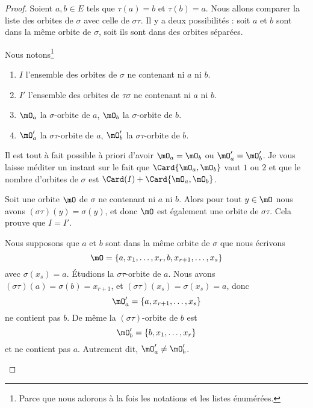 \begin{proof}
	Soient \( a,b\in E\) tels que \( \tau(a)=b\) et \( \tau(b)=a\). Nous allons comparer la liste des orbites de \( \sigma\) avec celle de \( \sigma\tau\). Il y a deux possibilités : soit \( a\) et \( b\) sont dans la même orbite de \( \sigma\), soit ils sont dans des orbites séparées.

	Nous notons\footnote{Parce que nous adorons à la fois les notations et les listes énumérées.}
	\begin{enumerate}
		\item
		      \( I\) l'ensemble des orbites de \( \sigma\) ne contenant ni \( a\) ni \( b\).
		\item
		      \( I'\) l'ensemble des orbites de \( \tau\sigma\) ne contenant ni \( a\) ni \( b\).
		\item
		      \( \mO_a\) la \( \sigma\)-orbite de \( a\), \( \mO_b\) la \( \sigma\)-orbite de \( b\).
		\item
		      \( \mO'_a\) la \( \sigma\tau\)-orbite de \( a\), \( \mO'_b\) la \( \sigma\tau\)-orbite de \( b\).
	\end{enumerate}
	Il est tout à fait possible à priori d'avoir \( \mO_a=\mO_b\) ou \( \mO'_a=\mO'_b\). Je vous laisse méditer un instant sur le fait que \( \Card\{ \mO_a,\mO_b \}\) vaut \( 1\) ou  \( 2\) et que le nombre d'orbites de \( \sigma\) est \( \Card(I)+\Card\{ \mO_a,\mO_b \}\).

	\begin{subproof}
		\spitem[\( I=I'\)]

		Soit une orbite \( \mO\) de \( \sigma\) ne contenant ni \( a\) ni \( b\). Alors pour tout \( y\in \mO\) nous avons \( (\sigma\tau)(y)=\sigma(y)\), et donc \( \mO\) est également une orbite de \( \sigma\tau\). Cela prouve que \( I=I'\).

		\spitem[Si \( \mO_a=\mO_b\)]
		Nous supposons que \( a\) et \( b\) sont dans la même orbite de \( \sigma\) que nous écrivons
		\begin{equation}
			\mO=\{ a,x_1,\ldots,x_r,b,x_{r+1},\ldots,x_s \}
		\end{equation}
		avec \( \sigma(x_s)=a\). Étudions la \( \sigma\tau\)-orbite de \( a\). Nous avons \( (\sigma\tau)(a)=\sigma(b)=x_{r+1}\), et \( (\sigma\tau)(x_s)=\sigma(x_s)=a\), donc
		\begin{equation}
			\mO'_a=\{ a,x_{r+1},\ldots,x_s \}
		\end{equation}
		ne contient pas \( b\). De même la \( (\sigma\tau)\)-orbite de \( b\) est
		\begin{equation}
			\mO'_b=\{ b,x_1,\ldots,x_r \}
		\end{equation}
		et ne contient pas \( a\). Autrement dit, \( \mO'_a\neq \mO'_b\).


\end{subproof}
\end{proof}
